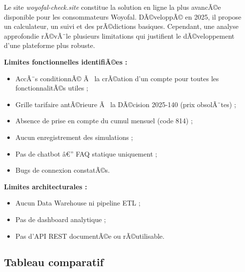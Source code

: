 \documentclass[12pt,a4paper]{report}
\begin{document}
Le site \textit{woyofal-check.site} constitue la solution en ligne la plus avancÃ©e disponible pour les consommateurs Woyofal. DÃ©veloppÃ© en 2025, il propose un calculateur, un suivi et des prÃ©dictions basiques. Cependant, une analyse approfondie rÃ©vÃ¨le plusieurs limitations qui justifient le dÃ©veloppement d'une plateforme plus robuste.

\textbf{Limites fonctionnelles identifiÃ©es :}
\begin{itemize}
  \item AccÃ¨s conditionnÃ© Ã  la crÃ©ation d'un compte pour toutes les fonctionnalitÃ©s utiles ;
  \item Grille tarifaire antÃ©rieure Ã  la DÃ©cision 2025-140 (prix obsolÃ¨tes) ;
  \item Absence de prise en compte du cumul mensuel (code 814) ;
  \item Aucun enregistrement des simulations ;
  \item Pas de chatbot â€” FAQ statique uniquement ;
  \item Bugs de connexion constatÃ©s.
\end{itemize}

\textbf{Limites architecturales :}
\begin{itemize}
  \item Aucun Data Warehouse ni pipeline ETL ;
  \item Pas de dashboard analytique ;
  \item Pas d'API REST documentÃ©e ou rÃ©utilisable.
\end{itemize}

\subsection{Tableau comparatif}
\end{document}
